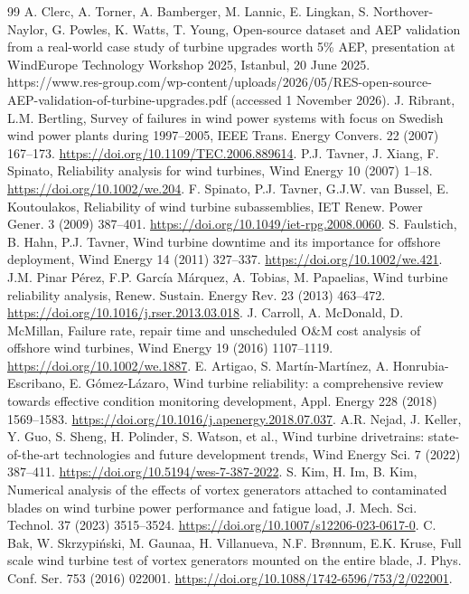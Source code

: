 \documentclass[preprint,12pt]{elsarticle}
\begin{document}
\begin{thebibliography}{99}
 A. Clerc, A. Torner, A. Bamberger, M. Lannic, E. Lingkan, S. Northover-Naylor, G. Powles, K. Watts, T. Young, Open-source dataset and AEP validation from a real-world case study of turbine upgrades worth 5\% AEP, presentation at WindEurope Technology Workshop 2025, Istanbul, 20 June 2025. https://www.res-group.com/wp-content/uploads/2026/05/RES-open-source-AEP-validation-of-turbine-upgrades.pdf (accessed 1 November 2026).
 J. Ribrant, L.M. Bertling, Survey of failures in wind power systems with focus on Swedish wind power plants during 1997--2005, IEEE Trans. Energy Convers. 22 (2007) 167--173. \url{https://doi.org/10.1109/TEC.2006.889614}.
 P.J. Tavner, J. Xiang, F. Spinato, Reliability analysis for wind turbines, Wind Energy 10 (2007) 1--18. \url{https://doi.org/10.1002/we.204}.
 F. Spinato, P.J. Tavner, G.J.W. van Bussel, E. Koutoulakos, Reliability of wind turbine subassemblies, IET Renew. Power Gener. 3 (2009) 387--401. \url{https://doi.org/10.1049/iet-rpg.2008.0060}.
 S. Faulstich, B. Hahn, P.J. Tavner, Wind turbine downtime and its importance for offshore deployment, Wind Energy 14 (2011) 327--337. \url{https://doi.org/10.1002/we.421}.
 J.M. Pinar Pérez, F.P. García Márquez, A. Tobias, M. Papaelias, Wind turbine reliability analysis, Renew. Sustain. Energy Rev. 23 (2013) 463--472. \url{https://doi.org/10.1016/j.rser.2013.03.018}.
 J. Carroll, A. McDonald, D. McMillan, Failure rate, repair time and unscheduled O\&M cost analysis of offshore wind turbines, Wind Energy 19 (2016) 1107--1119. \url{https://doi.org/10.1002/we.1887}.
 E. Artigao, S. Martín-Martínez, A. Honrubia-Escribano, E. Gómez-Lázaro, Wind turbine reliability: a comprehensive review towards effective condition monitoring development, Appl. Energy 228 (2018) 1569--1583. \url{https://doi.org/10.1016/j.apenergy.2018.07.037}.
 A.R. Nejad, J. Keller, Y. Guo, S. Sheng, H. Polinder, S. Watson, et al., Wind turbine drivetrains: state-of-the-art technologies and future development trends, Wind Energy Sci. 7 (2022) 387--411. \url{https://doi.org/10.5194/wes-7-387-2022}.
 S. Kim, H. Im, B. Kim, Numerical analysis of the effects of vortex generators attached to contaminated blades on wind turbine power performance and fatigue load, J. Mech. Sci. Technol. 37 (2023) 3515--3524. \url{https://doi.org/10.1007/s12206-023-0617-0}.
 C. Bak, W. Skrzypiński, M. Gaunaa, H. Villanueva, N.F. Brønnum, E.K. Kruse, Full scale wind turbine test of vortex generators mounted on the entire blade, J. Phys. Conf. Ser. 753 (2016) 022001. \url{https://doi.org/10.1088/1742-6596/753/2/022001}.

\end{thebibliography}
\end{document}
